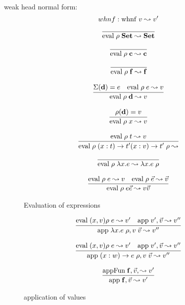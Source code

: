 weak head normal form: 
\[ whnf : \mathrm{whnf}\;v\leadsto v' \]
\begin{figure}[p]

\[\begin{array}{c}
	  \infer{\Eval{\rho}{\Set}{\Set}} 
          {} 
\end{array}
\]

\[
\begin{array}{c}
	  \infer{\Eval{\rho}{\cc}{\cc}} 
          {}

\end{array}
\]

\[\begin{array}{c}
	  \infer{\Eval{\rho}{\ff}{\ff}} 
          {} 
\end{array}
\]

\[\begin{array}{c}
	  \infer{\Eval{\rho}{\dd}{v}} 
          {\Lookup{\Sigma}{\dd}{e} & \Eval{\rho}{e}{v}} 
\end{array}
\]

\[\begin{array}{c}
	  \infer{\Eval{\rho}{x}{v}} 
          {\Lookup{\rho}{\dd}{v}} 
\end{array}
\]

\[\begin{array}{c}
	  \infer{\Eval{\rho}{\EPi{x}{t}{t'}{\VPi{x}{v}{t'}{\rho}}}}
          {\Eval{\rho}{t}{v}}
\end{array}
\]

\[\begin{array}{c}
	  \infer{\Eval{\rho}{\lam x . e}{\VLam{x}{e}{\rho}}}
		{} 
\end{array}
\]


\[
\begin{array}{c}
          
	  \infer{\Eval{\rho}{e \vec{e}}{v \vec{v}}}
          {\Eval{\rho}{e}{v} & \Eval{\rho}{\vec{e}}{\vec{v}}}
\end{array}
\]
\caption{Evaluation of expressions}
\end{figure}

\begin{figure}[p]

\[
\begin{array}{c}
          
	  \infer{\App{\VLam{x}{e}{\rho}}{v \; \vec{v}}{v''}}
          {\Eval{(x,v)\rho}{e}{v'} & \App{v'}{\vec{v}}{v''}}
\end{array}
\]

\[
\begin{array}{c}
          
	  \infer{\App{\VPi{x}{w}{e}{\rho}}{v \; \vec{v}}{v''}}
          {\Eval{(x,v)\rho}{e}{v'} & \App{v'}{\vec{v}}{v''}}

\end{array}
\]

\[
\begin{array}{c}
          
	  \infer{\App{\ff}{\vec{v}}{v'}}
          {\AppFun{\ff}{\vec{v}}{v'}}
\end{array}
\]

\caption{application of values}
\end{figure}



